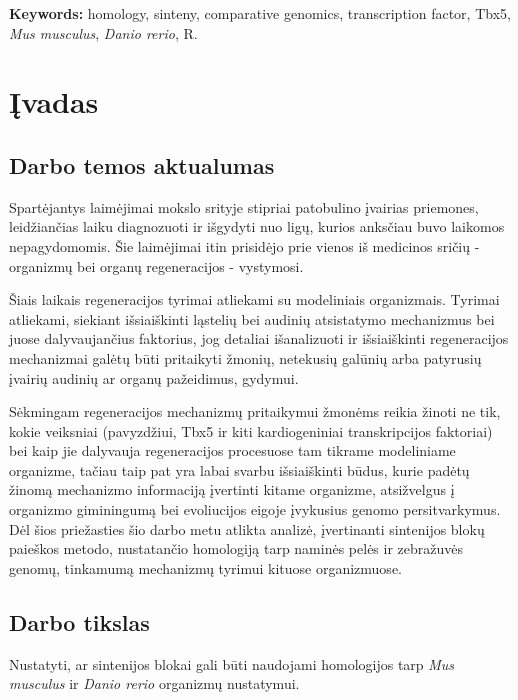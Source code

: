 \documentclass[12pt]{article}
\begin{document}
\hfill \break

\textbf{Keywords:} homology, sinteny, comparative genomics, transcription
factor, Tbx5, \emph{Mus musculus}, \emph{Danio rerio}, R.

\newpage


\section{Įvadas}
\subsection*{Darbo temos aktualumas}
Spartėjantys laimėjimai mokslo srityje stipriai patobulino įvairias priemones,
leidžiančias laiku diagnozuoti ir išgydyti nuo ligų, kurios anksčiau buvo
laikomos nepagydomomis. Šie laimėjimai itin prisidėjo prie vienos iš medicinos
sričių - organizmų bei organų regeneracijos - vystymosi.

Šiais laikais regeneracijos tyrimai atliekami su modeliniais organizmais.
Tyrimai atliekami, siekiant išsiaiškinti ląstelių bei audinių atsistatymo
mechanizmus bei juose dalyvaujančius faktorius, jog detaliai išanalizuoti ir
išsiaiškinti regeneracijos mechanizmai galėtų būti pritaikyti žmonių, netekusių
galūnių arba patyrusių įvairių audinių ar organų pažeidimus, gydymui.

Sėkmingam regeneracijos mechanizmų pritaikymui žmonėms reikia žinoti ne tik,
kokie veiksniai (pavyzdžiui, Tbx5 ir kiti kardiogeniniai transkripcijos
faktoriai) bei kaip jie dalyvauja regeneracijos procesuose tam tikrame
modeliniame organizme, tačiau taip pat yra labai svarbu išsiaiškinti būdus,
kurie padėtų žinomą mechanizmo informaciją įvertinti kitame organizme,
atsižvelgus į organizmo giminingumą bei evoliucijos eigoje įvykusius genomo
persitvarkymus. Dėl šios priežasties šio darbo metu atlikta analizė, įvertinanti
sintenijos blokų paieškos metodo, nustatančio homologiją tarp naminės pelės ir
zebražuvės genomų, tinkamumą mechanizmų tyrimui kituose organizmuose.

\subsection*{Darbo tikslas}
Nustatyti, ar sintenijos blokai gali būti naudojami homologijos tarp
\emph{Mus musculus} ir \emph{Danio rerio} organizmų nustatymui.
\end{document}
